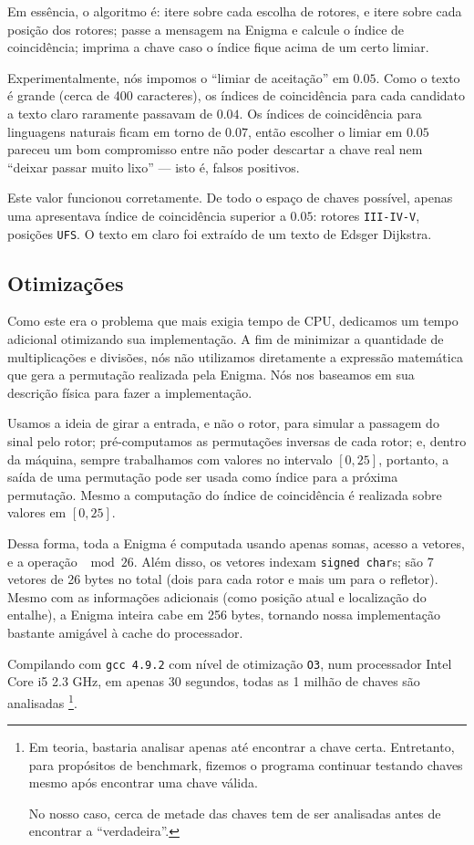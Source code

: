 \documentclass{article}
\begin{document}
Em essência, o algoritmo é:
itere sobre cada escolha de rotores,
e itere sobre cada posição dos rotores;
passe a mensagem na Enigma e calcule o índice de coincidência;
imprima a chave caso o índice fique acima de um certo limiar.

Experimentalmente, nós impomos o ``limiar de aceitação'' em $0.05$.
Como o texto é grande (cerca de 400 caracteres),
os índices de coincidência para cada candidato a texto claro
raramente passavam de $0.04$.
Os índices de coincidência para linguagens naturais
ficam em torno de $0.07$,
então escolher o limiar em $0.05$ pareceu um bom compromisso entre
não poder descartar a chave real
nem ``deixar passar muito lixo'' --- isto é, falsos positivos.

Este valor funcionou corretamente.
De todo o espaço de chaves possível,
apenas uma apresentava índice de coincidência superior a $0.05$:
rotores \texttt{III-IV-V}, posições \texttt{UFS}.
O texto em claro foi extraído de um texto de Edsger Dijkstra.

\subsection{Otimizações}

Como este era o problema que mais exigia tempo de CPU,
dedicamos um tempo adicional otimizando sua implementação.
A fim de minimizar a quantidade de multiplicações e divisões,
nós não utilizamos diretamente a expressão matemática
que gera a permutação realizada pela Enigma.
Nós nos baseamos em sua descrição física para fazer a implementação.

Usamos a ideia de girar a entrada,
e não o rotor,
para simular a passagem do sinal pelo rotor;
pré-computamos as permutações inversas de cada rotor;
e, dentro da máquina,
sempre trabalhamos com valores no intervalo $[0, 25]$,
portanto, a saída de uma permutação pode ser usada como índice
para a próxima permutação.
Mesmo a computação do índice de coincidência
é realizada sobre valores em $[0, 25]$.

Dessa forma, toda a Enigma é computada usando apenas somas,
acesso a vetores, e a operação $\mod 26$.
Além disso, os vetores indexam \texttt{signed char}s;
são 7 vetores de 26 bytes no total
(dois para cada rotor e mais um para o refletor).
Mesmo com as informações adicionais
(como posição atual e localização do entalhe),
a Enigma inteira cabe em 256 bytes,
tornando nossa implementação bastante amigável à cache do processador.

Compilando com \texttt{gcc 4.9.2} com nível de otimização \texttt{O3},
num processador Intel Core i5 2.3 GHz,
em apenas 30 segundos,
todas as 1 milhão de chaves são analisadas%
\footnote{
    Em teoria, bastaria analisar apenas até encontrar a chave certa.
    Entretanto, para propósitos de benchmark,
    fizemos o programa continuar testando chaves
    mesmo após encontrar uma chave válida.

    No nosso caso, cerca de metade das chaves tem de ser analisadas
    antes de encontrar a ``verdadeira''.
}.
\end{document}
